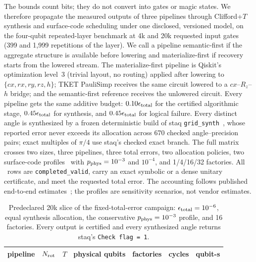 \documentclass[aps,prx,reprint,superscriptaddress,floatfix,longbibliography]{revtex4-2}
\begin{document}
The bounds count bits; they do not convert into gates or magic states.  We
therefore propagate the measured outputs of three pipelines through
Clifford+$T$ synthesis and surface-code scheduling under one disclosed,
versioned model, on the four-qubit repeated-layer benchmark at 4k and 20k
requested input gates (399 and 1{,}999 repetitions of the layer).  We call
a pipeline semantic-first if the aggregate structure is available before
lowering and materialize-first if recovery starts from the lowered
stream.  The materialize-first pipeline is Qiskit's
optimization level~3 (trivial layout, no routing) applied after lowering
to $\{cx,rx,ry,rz,h\}$; TKET PauliSimp receives the same circuit lowered to
a $cx$--$R_z$--$h$ bridge; and the semantic-first reference receives the
unlowered circuit.  Every pipeline gets the same additive budget:
$0.10\epsilon_{\rm total}$ for the certified algorithmic stage,
$0.45\epsilon_{\rm total}$ for synthesis, and $0.45\epsilon_{\rm total}$
for logical failure.  Every distinct angle is synthesized by a frozen
deterministic build of staq
\texttt{grid\_synth}~\cite{amy2020staq,ross2016optimal}, whose reported
error never exceeds its allocation across 670 checked angle--precision
pairs; exact multiples of $\pi/4$ use staq's checked exact branch.  The
full matrix crosses two sizes, three pipelines, three total
errors, two allocation policies, two surface-code
profiles~\cite{fowler2012surface,horsman2012lattice,litinski2019game,litinski2019magic}
with $p_{\rm phys}=10^{-3}$ and $10^{-4}$, and 1/4/16/32 factories.  All
\QRECells\ rows are \texttt{completed\_valid}, carry an exact symbolic or a
dense unitary certificate, and meet the requested total error.  The
accounting follows published end-to-end
estimates~\cite{gidney2021factor,beverland2022assessing}; the profiles are
sensitivity scenarios, not vendor estimates.

\begin{table}[t]
\centering
\footnotesize
\begin{tabular}{l r r r r r r}
\toprule
pipeline & $N_{\rm rot}$ & $T$ & physical qubits & factories & cycles & qubit-s \\
\midrule

\end{tabular}
\caption{Predeclared 20k slice of the fixed-total-error campaign:
$\epsilon_{\rm total}=10^{-6}$, equal synthesis allocation, the
conservative $p_{\rm phys}=10^{-3}$ profile, and 16 factories.  Every
output is certified and every synthesized angle returns staq's
\texttt{Check flag = 1}.}
\label{tab:resource-consequence}
\end{table}
\end{document}
